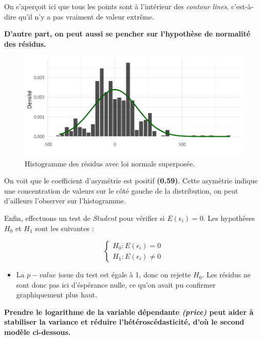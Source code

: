 \documentclass[
  12pt,
]{report}
\providecommand{\tightlist}{%
  \setlength{\itemsep}{0pt}\setlength{\parskip}{0pt}}\usepackage{longtable,booktabs,array}
\begin{document}
On s'aperçoit ici que tous les points sont à l'intérieur des
\emph{contour lines}, c'est-à-dire qu'il n'y a pas vraiment de valeur
extrême.

\textbf{D'autre part, on peut aussi se pencher sur l'hypothèse de
normalité des résidus.}

\begin{figure}[H]

{\centering \includegraphics{report_files/figure-pdf/normality_level-1.pdf}

}

\caption{Histogramme des résidus avec loi normale superposée.}

\end{figure}%

On voit que le coefficient d'asymétrie est positif \textbf{(0.59)}.
Cette asymétrie indique une concentration de valeurs sur le côté gauche
de la distribution, on peut d'ailleurs l'observer sur l'histogramme.

Enfin, effectuons un test de \emph{Student} pour vérifier si
\(E(\epsilon_i) = 0\). Les hypothèses \(H_0\) et \(H_1\) sont les
suivantes :

\[
\begin{cases}
H_0 : E(\epsilon_i) = 0\\
H_1 : E(\epsilon_i) \neq 0
\end{cases}
\]

\vspace{1em}

\begin{itemize}
\tightlist
\item
  La \(p-value\) issue du test est égale à 1, donc on rejette \(H_0\).
  Les résidus ne sont donc pas ici d'éspérance nulle, ce qu'on avait pu
  confirmer graphiquement plus haut.
\end{itemize}

\textbf{Prendre le logarithme de la variable dépendante \emph{(price)}
peut aider à stabiliser la variance et réduire l'hétéroscédasticité,
d'où le second modèle ci-dessous.}
\end{document}

